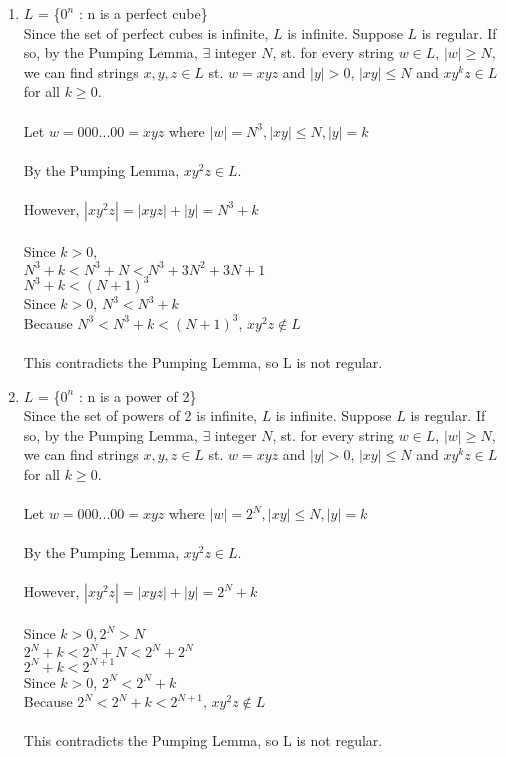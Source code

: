 \documentclass[a4paper]{article}
\begin{document}
\begin{enumerate}
\item $L$ = \{$0^n$ : n is a perfect cube\} \\
Since the set of perfect cubes is infinite, $L$ is infinite. Suppose $L$ is regular. If so, by the Pumping Lemma, $\exists$ integer $N$, st. for every string $w \in L$, $|w| \ge N$, we can find strings $x, y, z \in L$ st. $w=xyz$ and $|y|>0$, $|xy| \le N$ and $xy^k z \in L$ for all $k \ge 0$. 
\\ \\
Let $w = 000...00 = xyz$ where $|w| = N^3, |xy| \le N, |y| = k$ \\
\\
By the Pumping Lemma, $xy^2 z \in L$. \\
\\
However, $|xy^2z| = |xyz| + |y| = N^3+k$ \\
\\
Since $k>0,$ \\
$N^3 + k < N^3 + N < N^3 + 3N^2 + 3N + 1$ \\
$N^3 + k < (N+1)^3$
\\
Since $k>0$, $N^3 < N^3 + k$ \\
Because $N^3 < N^3 + k < (N+1)^3$, $xy^2z \notin L$ \\
\\
This contradicts the Pumping Lemma, so L is not regular.
\\


\item $L$ = \{$0^n$ : n is a power of 2\} \\
Since the set of powers of 2 is infinite, $L$ is infinite. Suppose $L$ is regular. If so, by the Pumping Lemma, $\exists$ integer $N$, st. for every string $w \in L$, $|w| \ge N$, we can find strings $x, y, z \in L$ st. $w=xyz$ and $|y|>0$, $|xy| \le N$ and $xy^k z \in L$ for all $k \ge 0$. 
\\ \\
Let $w = 000...00 = xyz$ where $|w| = 2^N, |xy| \le N, |y| = k$ \\
\\
By the Pumping Lemma, $xy^2 z \in L$. \\
\\
However, $|xy^2z| = |xyz| + |y| = 2^N+k$ \\
\\
Since $k>0,2^N>N$ \\
$2^N + k < 2^N + N < 2^N + 2^N$ \\
$2^N + k < 2^{N+1}$
\\
Since $k>0$, $2^N < 2^N + k$ \\
Because $2^N < 2^N + k < 2^{N+1}$, $xy^2z \notin L$ \\
\\
This contradicts the Pumping Lemma, so L is not regular. \\
\\




\end{enumerate}
\end{document}
